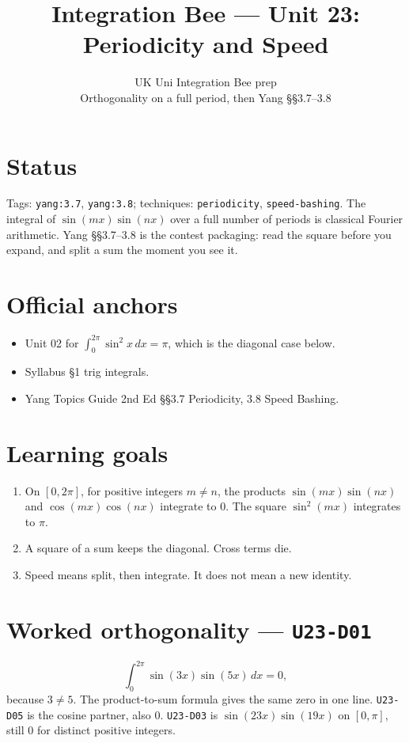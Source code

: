 
\title{Integration Bee --- Unit 23:\\ Periodicity and Speed}
\author{UK Uni Integration Bee prep\\ Orthogonality on a full period, then Yang \S\S3.7--3.8}
\date{}

\maketitle
\section*{Status}
Tags: \texttt{yang:3.7}, \texttt{yang:3.8}; techniques: \texttt{periodicity}, \texttt{speed-bashing}.
The integral of $\sin(mx)\sin(nx)$ over a full number of periods is classical Fourier arithmetic. Yang \S\S3.7--3.8 is the contest packaging: read the square before you expand, and split a sum the moment you see it.
\section{Official anchors}
\begin{itemize}
\item Unit 02 for $\int_0^{2\pi}\sin^2 x\,dx=\pi$, which is the diagonal case below.
\item Syllabus \S1 trig integrals.
\item Yang Topics Guide 2nd Ed \S\S3.7 Periodicity, 3.8 Speed Bashing.
\end{itemize}
\section{Learning goals}
\begin{enumerate}
  \item On $[0,2\pi]$, for positive integers $m\neq n$, the products $\sin(mx)\sin(nx)$ and $\cos(mx)\cos(nx)$ integrate to 0. The square $\sin^2(mx)$ integrates to $\pi$.
  \item A square of a sum keeps the diagonal. Cross terms die.
  \item Speed means split, then integrate. It does not mean a new identity.
\end{enumerate}

\section{Worked orthogonality --- \texttt{U23-D01}}
\[
\int_0^{2\pi}\sin(3x)\sin(5x)\,dx=0,
\]
because $3\neq 5$. The product-to-sum formula gives the same zero in one line. \texttt{U23-D05} is the cosine partner, also 0. \texttt{U23-D03} is $\sin(23x)\sin(19x)$ on $[0,\pi]$, still 0 for distinct positive integers.

